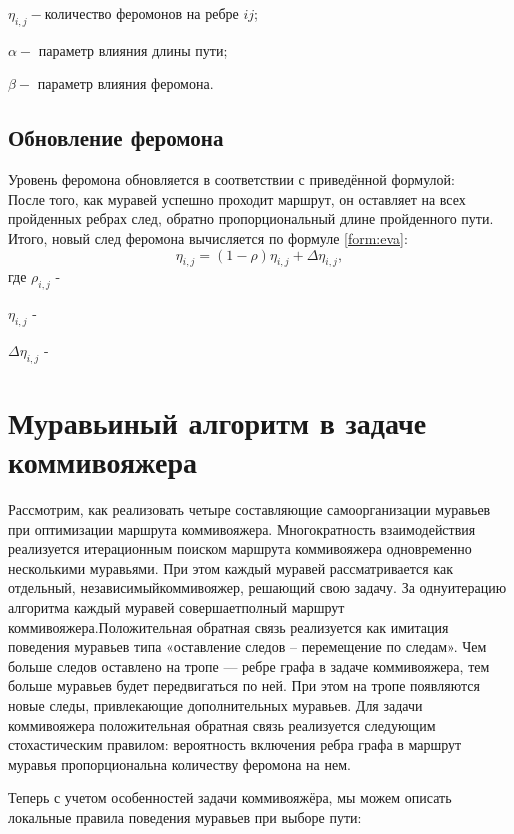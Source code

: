 \documentclass[12pt]{report}
\begin{document}
         $\eta _{i,j} - $количество феромонов на ребре $ij$;
         
          $\alpha - $ параметр влияния длины пути;
          
          $\beta - $ параметр влияния феромона.


\subsection{Обновление феромона}

  Уровень феромона обновляется в соответствии с приведённой формулой:\\
После того, как муравей успешно проходит маршрут, он оставляет на всех пройденных ребрах след, обратно пропорциональный длине пройденного пути. Итого, новый след феромона вычисляется по формуле \ref{form:eva}:
\begin{equation}\label{form:eva} 
    \eta _{i,j}=(1-\rho )\eta _{i,j}+\Delta \eta _{i,j},
\end{equation}
где \quad$ \rho _{i,j}$ -  

    $\eta _{i,j}$ -  
    
    $\Delta \eta _{i,j}$ - 


\section{Муравьиный алгоритм в задаче коммивояжера}
Рассмотрим, как реализовать четыре составляющие самоорганизации муравьев при оптимизации маршрута коммивояжера. Многократность взаимодействия реализуется итерационным поиском маршрута коммивояжера одновременно несколькими муравьями. При этом каждый муравей рассматривается как отдельный, независимыйкоммивояжер, решающий свою задачу. За однуитерацию алгоритма каждый муравей совершаетполный маршрут коммивояжера.Положительная обратная связь реализуется как имитация поведения муравьев типа «оставление следов – перемещение по следам». Чем больше следов оставлено на тропе — ребре графа в задаче коммивояжера, тем больше муравьев будет передвигаться по ней. При этом на тропе появляются новые следы, привлекающие дополнительных муравьев. Для задачи коммивояжера положительная обратная связь реализуется следующим стохастическим правилом: вероятность включения ребра графа в маршрут муравья пропорциональна количеству феромона на нем.
		
Теперь с учетом особенностей задачи коммивояжёра, мы можем описать локальные правила поведения муравьев при выборе пути:
\end{document}
